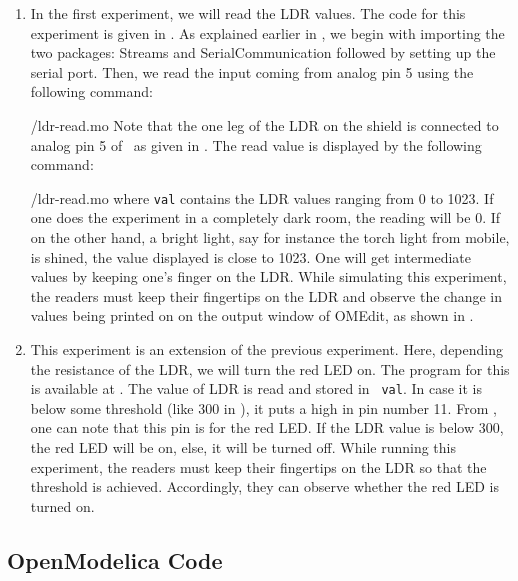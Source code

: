 \begin{enumerate}
\item In the first experiment, we will read the LDR values. The code for this experiment is given in
 . As explained earlier in , 
  we begin with importing the two packages: Streams and SerialCommunication followed 
  by setting up the serial port. Then, we read the input coming from analog pin 5 using the 
following command:

{\LocLDROpenModelicacode/ldr-read.mo} Note that the one leg of the LDR on
the shield is connected to analog pin 5 of \arduino\, 
as given in . The read value is displayed 
 by the following command: 

{\LocLDROpenModelicacode/ldr-read.mo} where {\tt val} contains
the LDR values ranging from 0 to 1023. If one does the experiment in a completely dark room, the
reading will be 0. If on the other hand, a bright light, say for instance the torch
light from mobile, is shined, the value displayed is close to 1023. One will get
intermediate values by keeping one's finger on the LDR. While simulating this experiment, the readers must keep their fingertips on the LDR and
observe the change in values being printed on on the output window of OMEdit, as shown in .

\item This experiment is an extension of the previous experiment. Here, depending the resistance of the LDR, we will
  turn the red LED on.  The program for this is available at
  .  The value of LDR is read and stored in {\tt
    val}.  In case it is below some threshold (like 300 in ), 
    it puts a high in pin number 11. From , 
    one can note that this pin is for the red LED. If the LDR value is below 300, 
    the red LED will be on, else, it will be turned off. While running this experiment, the readers 
    must keep their fingertips on the LDR so that the threshold is achieved. Accordingly, 
    they can observe whether the red LED is turned on. 
\end{enumerate}

\subsection{OpenModelica Code}
\label{sec:ldr-OpenModelica-code}

